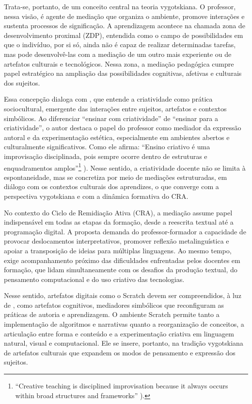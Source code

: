 \documentclass[portuguese]{textolivre}
\begin{document}
Trata-se, portanto, de um conceito central na teoria vygotskiana. O professor, nessa visão, é agente de mediação que organiza o ambiente, promove interações e sustenta processos de significação. A aprendizagem acontece na chamada zona de desenvolvimento proximal (ZDP), entendida como o campo de possibilidades em que o indivíduo, por si só, ainda não é capaz de realizar determinadas tarefas, mas pode desenvolvê-las com a mediação de um outro mais experiente ou de artefatos culturais e tecnológicos. Nessa zona, a mediação pedagógica cumpre papel estratégico na ampliação das possibilidades cognitivas, afetivas e culturais dos sujeitos.

Essa concepção dialoga com \textcite{sawyer2004}, que entende a criatividade como prática sociocultural, emergente das interações entre sujeitos, artefatos e contextos simbólicos. Ao diferenciar ``ensinar com criatividade'' de ``ensinar para a criatividade'', o autor destaca o papel do professor como mediador da expressão autoral e da experimentação estética, especialmente em ambientes abertos e culturalmente significativos. Como ele afirma: ``Ensino criativo é uma improvisação disciplinada, pois sempre ocorre dentro de estruturas e enquadramentos amplos''\footnote{“Creative teaching is disciplined improvisation because it always occurs within broad structures and frameworks” \cite[p.~13]{sawyer2004}).} \cite[p.~13]{sawyer2004}). Nesse sentido, a criatividade docente não se limita à espontaneidade, mas se concretiza por meio de mediações estruturadas, em diálogo com os contextos culturais dos aprendizes, o que converge com a perspectiva vygotskiana e com a dinâmica formativa do CRA.

No contexto do Ciclo de Remidiação Ativa (CRA), a mediação assume papel indispensável em todas as etapas da formação, desde a reescrita textual até a programação digital. A proposta demanda do professor-formador a capacidade de provocar deslocamentos interpretativos, promover reflexão metalinguística e apoiar a transposição de ideias para múltiplas linguagens. Ao mesmo tempo, exige acompanhamento próximo das dificuldades enfrentadas pelos docentes em formação, que lidam simultaneamente com os desafios da produção textual, do pensamento computacional e do uso criativo das tecnologias.

Nesse sentido, artefatos digitais como o Scratch devem ser compreendidos, à luz de \textcite{vygotsky2007}, como artefatos cognitivos, mediadores simbólicos que reconfiguram as práticas de autoria e aprendizagem. O ambiente Scratch permite tanto a implementação de algoritmos e narrativas quanto a reorganização de conceitos, a articulação entre forma e conteúdo e a experimentação criativa em linguagem natural, visual e computacional. Ele se insere, portanto, na tradição vygotskiana de artefatos culturais que expandem os modos de pensamento e expressão dos sujeitos.
\end{document}
